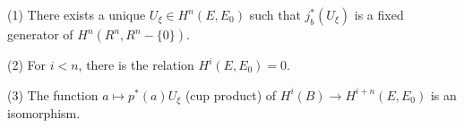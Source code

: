 (1) There exists a unique $U_\xi \in H^n(E, E_0)$ such that $j_b^*(U_\xi)$ is a fixed generator of $H^n(R^n, R^n - \{0\})$.

(2) For $i < n$, there is the relation $H^i(E, E_0) = 0$.

(3) The function $a \mapsto p^*(a)U_\xi$ (cup product) of $H^i(B) \rightarrow H^{i+n}(E, E_0)$ is an isomorphism.
